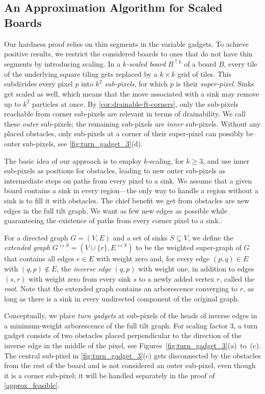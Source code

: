 \documentclass[a4paper,UKenglish,cleveref,thm-restate]{lipics-v2021}
\newcommand{\bScale}[2][k]{\ensuremath{{#2}^{\uparrow {#1}}}}
\newcommand{\gExt}[1][G]{\ensuremath{{#1}^{\leftrightarrow S}}}
\begin{document}
 
\subsection{An Approximation Algorithm for Scaled Boards}\label{subsec:approx}

Our hardness proof relies on thin segments in the variable gadgets. To achieve
positive results, we restrict the considered boards to ones that do not have
thin segments by introducing scaling. In a \emph{$k$-scaled board} $\bScale{B}$
of a board $B$, every tile of the underlying square tiling gets replaced by a
$k \times k$ grid of tiles. This subdivides every pixel $p$ into $k^2$
\emph{sub-pixels}, for which $p$ is their \emph{super-pixel}. Sinks get scaled
as well, which means that the move associated with a sink may remove up to $k^2$
particles at once. By \cref{cor:drainable-ft-corners}, only the sub-pixels reachable
from corner sub-pixels are relevant in terms of drainability. We call these
\emph{outer} sub-pixels; the remaining sub-pixels are \emph{inner}
sub-pixels. Without any placed obstacles, only sub-pixels at a corner of their
super-pixel can possibly be outer sub-pixels, see \cref{fig:turn_gadget_3}(d).

The basic idea of our approach is to employ $k$-scaling, for $k \geq 3$, and use
inner sub-pixels as positions for obstacles, leading to new outer sub-pixels as intermediate steps on
paths from every pixel to a sink. We assume that a given board contains a
sink in every region---the only way to handle a region without a sink is to fill
it with obstacles. The chief benefit we get from obstacles are
new edges in the full tilt graph. We want as
few new edges as possible while guaranteeing the existence of paths from
every corner pixel to a sink.

For a directed graph $G=(V,E)$ and a set of sinks $S \subseteq V$, we define
the \emph{extended graph} \(\gExt=(V \cup \{r\} ,\gExt[E])\) to be the weighted
super-graph of $G$ that contains all edges $e \in E$ with weight zero and, for
every edge $(p,q) \in E$ with \((q,p) \notin E\), the \emph{inverse edge}
$(q,p)$ with weight one, in addition to edges $(s,r)$ with weight zero from
every sink $s$ to a newly added vertex $r$, called the \emph{root}. Note that
the extended graph contains an arborescence converging to $r$, as long as there
is a sink in every undirected component of the original graph.

Conceptually, we place \emph{turn gadgets} at sub-pixels of the heads of inverse
edges in a minimum-weight arborescence of the full tilt graph. For scaling
factor $3$, a turn gadget consists of two obstacles placed perpendicular to the
direction of the inverse edge in the middle of the pixel,
see Figures~\ref{fig:turn_gadget_3}(a)~to~(c). The central sub-pixel
in \cref{fig:turn_gadget_3}(c) gets disconnected by the obstacles from the rest
of the board and is not considered an outer sub-pixel, even though it is a
corner sub-pixel; it will be handled separately in the proof
of \cref{approx_feasible}.
\end{document}

